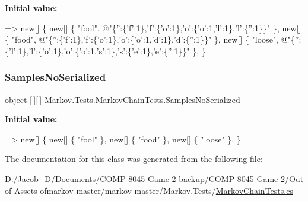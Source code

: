 {\bfseries Initial value\+:}
\begin{DoxyCode}
=> \textcolor{keyword}{new}[]
        \{
            \textcolor{keyword}{new}[] \{ \textcolor{stringliteral}{"fool"}, \textcolor{stringliteral}{@"\{'':\{'f':1\},'f':\{'o':1\},'o':\{'o':1,'l':1\},'l':\{'':1\}\}"} \},
            \textcolor{keyword}{new}[] \{ \textcolor{stringliteral}{"food"}, \textcolor{stringliteral}{@"\{'':\{'f':1\},'f':\{'o':1\},'o':\{'o':1,'d':1\},'d':\{'':1\}\}"} \},
            \textcolor{keyword}{new}[] \{ \textcolor{stringliteral}{"loose"}, \textcolor{stringliteral}{@"\{'':\{'l':1\},'l':\{'o':1\},'o':\{'o':1,'s':1\},'s':\{'e':1\},'e':\{'':1\}\}"} \},
        \}
\end{DoxyCode}
\mbox{\label{class_markov_1_1_tests_1_1_markov_chain_tests_a338cec67d23915f6295d6c34eb1d6df6}} 
\subsubsection{\texorpdfstring{Samples\+No\+Serialized}{SamplesNoSerialized}}
{\footnotesize\ttfamily object \mbox{[}$\,$\mbox{]}\mbox{[}$\,$\mbox{]} Markov.\+Tests.\+Markov\+Chain\+Tests.\+Samples\+No\+Serialized\hspace{0.3cm}{\ttfamily [static]}}

{\bfseries Initial value\+:}
\begin{DoxyCode}
=> \textcolor{keyword}{new}[]
        \{
            \textcolor{keyword}{new}[] \{ \textcolor{stringliteral}{"fool"} \},
            \textcolor{keyword}{new}[] \{ \textcolor{stringliteral}{"food"} \},
            \textcolor{keyword}{new}[] \{ \textcolor{stringliteral}{"loose"} \},
        \}
\end{DoxyCode}


The documentation for this class was generated from the following file\+:\begin{DoxyCompactItemize}
\item 
D\+:/\+Jacob\+\_\+\+D/\+Documents/\+C\+O\+M\+P 8045 Game 2 backup/\+C\+O\+M\+P 8045 Game 2/\+Out of Assets-\/ofmarkov-\/master/markov-\/master/\+Markov.\+Tests/\mbox{\hyperlink{_markov_chain_tests_8cs}{Markov\+Chain\+Tests.\+cs}}\end{DoxyCompactItemize}
